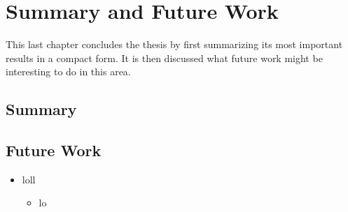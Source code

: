 \chapter{Summary and Future Work}\label{ch:summary_and_discussion}

This last chapter concludes the thesis by first summarizing its most important results in a compact form. It is then discussed what future work might be interesting to do in this area.

\section{Summary}

\section{Future Work}

\begin{itemize}
	\item loll
	\begin{itemize}
		\item lo
	\end{itemize}
\end{itemize}


